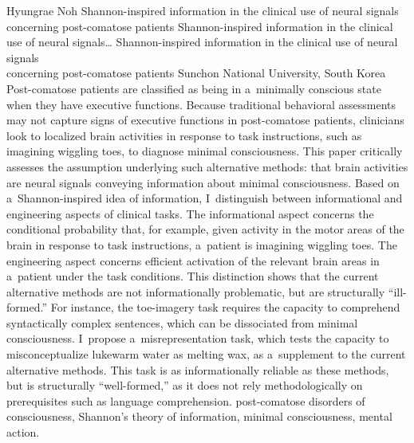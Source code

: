 \begin{artengenv}{Hyungrae Noh}
	{Shannon-inspired information in the clinical use of neural signals concerning post-comatose patients}
	{Shannon-inspired information in the clinical use of neural signals\ldots}
	{Shannon-inspired information in the clinical use of neural signals\\concerning post-comatose patients}
	{Sunchon National University, South Korea}
	{Post-comatose patients are classified as being in a~minimally conscious state when they have executive functions. Because traditional behavioral assessments may not capture signs of executive functions in post-comatose patients, clinicians look to localized brain activities in response to task instructions, such as imagining wiggling toes, to diagnose minimal consciousness. This paper critically assesses the assumption underlying such alternative methods: that brain activities are neural signals conveying information about minimal consciousness. Based on a~Shannon-inspired idea of information, I~distinguish between informational and engineering aspects of clinical tasks. The informational aspect concerns the conditional probability that, for example, given activity in the motor areas of the brain in response to task instructions, a~patient is imagining wiggling toes. The engineering aspect concerns efficient activation of the relevant brain areas in a~patient under the task conditions. This distinction shows that the current alternative methods are not informationally problematic, but are structurally ``ill-formed.'' For instance, the toe-imagery task requires the capacity to comprehend syntactically complex sentences, which can be dissociated from minimal consciousness. I~propose a~misrepresentation task, which tests the capacity to misconceptualize lukewarm water as melting wax, as a~supplement to the current alternative methods. This task is as informationally reliable as these methods, but is structurally ``well-formed,'' as it does not rely methodologically on prerequisites such as language comprehension.
	}
	{post-comatose disorders of consciousness, Shannon's theory of information, minimal consciousness, mental action.}
	
	






\end{artengenv}
